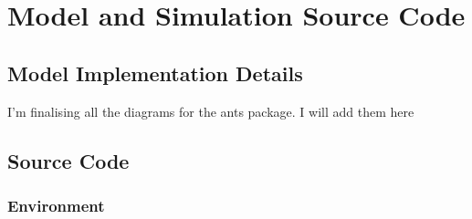 \chapter{Model and Simulation Source Code}
\label{chapter:model-code}

\section{Model Implementation Details}

I'm finalising all the diagrams for the ants package. I will add them here

\section{Source Code}

\subsection{Environment}
\label{code:env}













